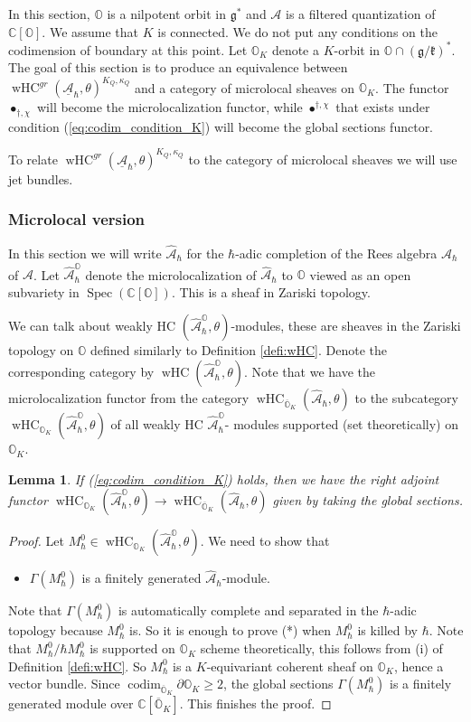 \documentclass[12pt]{amsart}
\newcommand{\C}{\mathbb{C}}
\newcommand{\A}{\mathcal{A}}
\newcommand{\g}{\mathfrak{g}}
\newcommand{\Orb}{\mathbb{O}}
\newcommand{\kf}{\mathfrak{k}}
\newcommand{\wHC}{\operatorname{wHC}}
\newtheorem{Lem}[Thm]{Lemma}
\theoremstyle{definition}
\numberwithin{equation}{section}
\begin{document}
In this section, $\Orb$ is a nilpotent orbit in $\g^*$ and $\A$ is a filtered quantization
of $\C[\Orb]$. We assume that $K$ is connected.
We do not put any conditions on the codimension of boundary at this point. Let
$\Orb_K$ denote a $K$-orbit in $\Orb\cap (\g/\kf)^*$. The goal of this section
is to produce an equivalence between $\wHC^{gr}(\underline{\A}_\hbar,\theta)^{K_Q,\kappa_Q}$
and a category of microlocal sheaves on $\Orb_K$. The functor $\bullet_{\dagger,\chi}$
will become the microlocalization functor, while  $\bullet^{\dagger,\chi}$ that exists
under condition (\ref{eq:codim_condition_K}) will
become the global sections functor.

To relate  $\wHC^{gr}(\underline{\A}_\hbar,\theta)^{K_Q,\kappa_Q}$ to the category of microlocal sheaves
we will use jet bundles.

\subsubsection{Microlocal version}
In this section we will write $\hat{\A}_\hbar$ for the $\hbar$-adic completion of the
Rees algebra $\A_\hbar$ of $\A$. Let $\hat{\A}_\hbar^{\Orb}$ denote the microlocalization of
$\hat{\A}_\hbar$ to $\Orb$ viewed as an open subvariety in $\operatorname{Spec}(\C[\Orb])$.
This is a sheaf in Zariski topology.


We can talk about  weakly HC $(\hat{\A}_\hbar^\Orb,\theta)$-modules, these are sheaves in the Zariski
topology on $\Orb$ defined similarly to Definition \ref{defi:wHC}.
Denote the corresponding category by $\wHC(\hat{\A}_\hbar^\Orb,\theta)$. Note that we have
the microlocalization functor from the category $\wHC_{\overline{\Orb}_K}(\hat{\A}_\hbar,\theta)$
to the subcategory $\wHC_{\Orb_K}(\hat{\A}^\Orb_\hbar,\theta)$ of all weakly HC $\hat{\A}^\Orb_\hbar$-
modules supported (set theoretically) on $\Orb_K$.

\begin{Lem}\label{Lem:global_sections}
If (\ref{eq:codim_condition_K}) holds, then we have the right
adjoint functor $\wHC_{\Orb_K}(\hat{\A}^\Orb_\hbar,\theta)\rightarrow
\wHC_{\overline{\Orb}_K}(\hat{\A}_\hbar,\theta)$ given by taking the global sections.
\end{Lem}
\begin{proof}
Let $M_\hbar^0\in \wHC_{\Orb_K}(\hat{\A}^\Orb_\hbar,\theta)$. We need to show that
\begin{itemize}
\item[(*)]
$\Gamma(M_\hbar^0)$ is a finitely generated $\hat{\A}_\hbar$-module.
\end{itemize}
Note that $\Gamma(M_\hbar^0)$ is automatically
complete and separated in the $\hbar$-adic topology because $M_\hbar^0$ is. So it is
enough to prove (*) when $M_\hbar^0$ is killed by $\hbar$.
Note that $M_\hbar^0/\hbar M_{\hbar}^0$
is supported on $\Orb_K$ scheme theoretically, this follows from (i)
of Definition \ref{defi:wHC}.
So $M_\hbar^0$
is a $K$-equivariant coherent sheaf on $\Orb_K$, hence a vector bundle. Since $\operatorname{codim}_{\overline{\Orb}_K}\partial\Orb_K\geqslant 2$, the global sections
$\Gamma(M^0_\hbar)$ is a finitely generated module over $\C[\overline{\Orb}_K]$. This finishes
the proof.
\end{proof}
\end{document}
